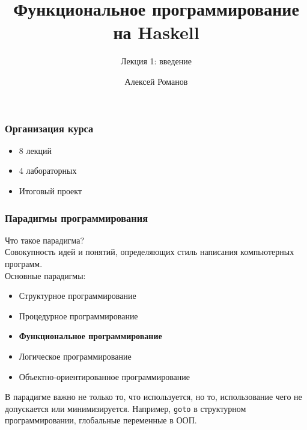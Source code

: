 \documentclass[12pt]{beamer}
\begin{document}
	\author{Алексей Романов}
	\title{Функциональное программирование на Haskell}
	\subtitle{Лекция 1: введение}
	\subject{Функциональное программирование на Haskell}
	\begin{frame}[plain]
	\maketitle
\end{frame}

\begin{frame}
\frametitle{Организация курса}
\begin{itemize}
    \item 8 лекций
    \item 4 лабораторных
    \item Итоговый проект
\end{itemize}
\end{frame}

\begin{frame}
\frametitle{Парадигмы программирования}
Что такое парадигма? \\
\pause
\hspace*{20pt} Совокупность идей и понятий, определяющих стиль написания компьютерных программ. \\
\pause
Основные парадигмы: \\
\pause
\begin{itemize}
    \item Структурное программирование
    \item Процедурное программирование
    \item \textbf{Функциональное программирование}
    \item Логическое программирование
    \item Объектно-ориентированное программирование
\end{itemize}
\pause
В парадигме важно не только то, что используется, но то, использование чего не допускается или минимизируется.
\pause
Например, \lstinline!goto! в структурном программировании, глобальные переменные в ООП.
\end{frame}
\end{document}

